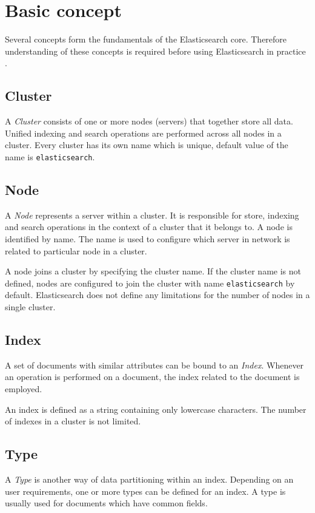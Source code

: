 \documentclass[12pt,oneside]{fithesis2}
\begin{document}
\section{Basic concept}
Several concepts form the fundamentals of the Elasticsearch core. Therefore understanding of these concepts is required before using Elasticsearch in practice \cite{elasticsearch_doc}.

\subsection{Cluster}
A \textit{Cluster} consists of one or more nodes (servers) that together store all data. Unified indexing and search operations are performed across all nodes in a cluster. Every cluster has its own name which is unique, default value of the name is \verb|elasticsearch|.

\subsection{Node}
A \textit{Node} represents a server within a cluster. It is responsible for store, indexing and search operations in the context of a cluster that it belongs to. A node is identified by name. The name is used to configure which server in network is related to particular node in a cluster.

A node joins a cluster by specifying the cluster name. If the cluster name is not defined, nodes are configured to join the cluster with name \verb|elasticsearch| by default. Elasticsearch does not define any limitations for the number of nodes in a single cluster.

\subsection{Index}
A set of documents with similar attributes can be bound to an \textit{Index}. Whenever an operation is performed on a document, the index related to the document is employed.

An index is defined as a string containing only lowercase characters. The number of indexes in a cluster is not limited.

\subsection{Type}
A \textit{Type} is another way of data partitioning within an index. Depending on an user requirements, one or more types can be defined for an index. A type is usually used for documents which have common fields.
\end{document}
